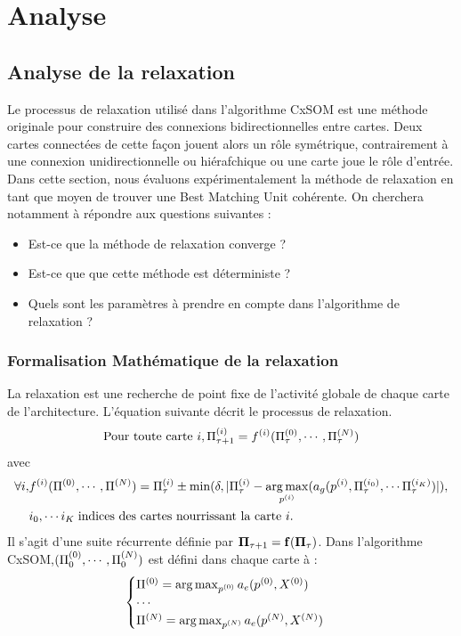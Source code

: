 \chapter{Analyse}

\section{Analyse de la relaxation}
\graphicspath{{04-Analyse/}}
\minitoc
Le processus de relaxation utilisé dans l'algorithme CxSOM est une méthode originale pour construire des connexions bidirectionnelles entre cartes. Deux cartes connectées de cette façon jouent alors un rôle symétrique, contrairement à une connexion unidirectionnelle ou hiérafchique ou une carte joue le rôle d'entrée. Dans cette section, nous évaluons expérimentalement la méthode de relaxation en tant que moyen de trouver une Best Matching Unit cohérente. On cherchera notamment à répondre aux questions suivantes :  
\begin{itemize}
\item Est-ce que la méthode de relaxation converge ?
\item Est-ce que que cette méthode est déterministe ?
\item Quels sont les paramètres à prendre en compte dans l'algorithme de relaxation ?
\end{itemize}

\subsection{Formalisation Mathématique de la relaxation}
La relaxation est une recherche de point fixe de l'activité globale de chaque carte de l'architecture. L'équation suivante décrit le processus de relaxation. 
\begin{equation}
\text{Pour toute carte $i$}, \Pi^{({i})}_{\tau +1} = f^{({i})}(\Pi^{({0})}_\tau,\cdots,\Pi^{({N})}_\tau)
\label{eq:evolution}
\end{equation}
avec
\begin{equation}
\begin{split}
\forall i, &f^{({i})}(\Pi^{({0})},\cdots,\Pi^{({N})})= \Pi^{({i})}_{\tau} \pm \min(\delta, \lvert \Pi^{({i})}_{\tau} - \operatorname*{arg\,max}_{p^{({i})}}(a_g(p^{({i})},\Pi^{({i_0})}_\tau, \cdots \Pi^{({i_K})}_\tau) \rvert),\\
&i_0, \cdots i_K \; \text{indices des cartes nourrissant la carte $i$}.
\end{split}
\label{eq:fonction}
\end{equation}
Il s'agit d'une suite récurrente définie par $\mathbf{\Pi}_{\tau+1} = \mathbf{f}(\mathbf{\Pi}_\tau)$.
Dans l'algorithme CxSOM,$(\Pi^{({0})}_0, \cdots , \Pi^{({N})}_0)$ est défini dans chaque carte à : 
\begin{equation}
\begin{cases}
\Pi^{({0})} = \operatorname*{arg\,max}_{p^{({0})}} a_e(p^{({0})},X^{({0})})\\
\cdots \\
\Pi^{({N})} = \operatorname*{arg\,max}_{p^{({N})}} a_e(p^{({N})},X^{({N})})\\
\end{cases}
\label{eq:init}
\end{equation}

